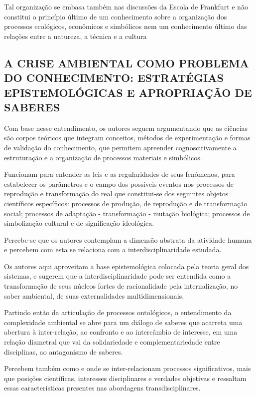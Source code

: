 \documentclass[
   article,       %
   12pt,          %
   oneside,       %
   a4paper,       %
   english,       %
   brazil,           %
   sumario=tradicional
   ]{abntex2}
\begin{document}
Tal organização se embasa também nas discussões da Escola de Frankfurt e não constitui o princípio último de um conhecimento sobre a organização dos processos ecológicos, econômicos e simbólicos nem um conhecimento último das relações entre a natureza, a técnica e a cultura


\subsection{A CRISE AMBIENTAL COMO PROBLEMA DO CONHECIMENTO:
ESTRATÉGIAS EPISTEMOLÓGICAS E APROPRIAÇÃO DE SABERES}


Com base nesse entendimento, os autores seguem argumentando que as ciências são corpos teóricos que integram conceitos, métodos de experimentação e formas de validação do conhecimento, que permitem apreender cognoscitivamente a estruturação e a organização de processos materiais e simbólicos.

Funcionam para entender as leis e as regularidades de seus fenômenos, para estabelecer os parâmetros e o campo dos possíveis eventos nos processos de reprodução e transformação do real que constitui-se dos seguintes objetos científicos específicos: processos de produção, de reprodução e de transformação social; processos de adaptação - transformação - mutação biológica; processos de simbolização cultural e de significação ideológica. 

Percebe-se que os autores contemplam a dimensão abstrata da atividade humana e percebem com esta se relaciona com a interdisciplinaridade estudada.

Os autores aqui aproveitam a base epistemológica colocada pela teoria geral dos sistemas, e sugerem que a interdisciplinaridade pode ser entendida como a transformação de seus núcleos fortes de racionalidade pela internalização, no saber ambiental, de suas externalidades multidimensionais.

Partindo então da articulação de processos ontológicos, o entendimento da complexidade ambiental se abre para um diálogo de saberes que acarreta uma abertura à inter-relação, ao confronto e ao intercâmbio de interesse, em uma relação diametral que vai da solidariedade e complementariedade entre disciplinas, ao antagonismo de saberes. 

Percebem também como e onde se inter-relacionam processos significativos, mais que posições científicas, interesses disciplinares e verdades objetivas e ressaltam essas características presentes nas abordagens transdisciplinares.
\end{document}
